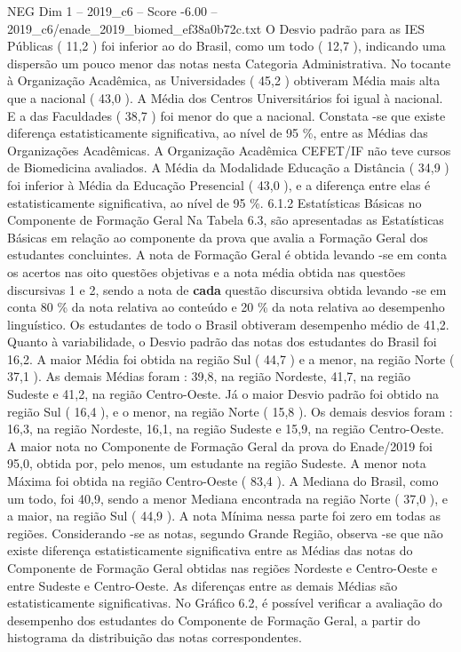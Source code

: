 \begin{textsample}{NEG Dim 1 – 2019\_c6 – Score -6.00 – 2019\_c6/enade\_2019\_biomed\_ef38a0b72c.txt}
O Desvio padrão para as IES Públicas ( 11,2 ) foi inferior ao do Brasil, como um todo ( 12,7 ), indicando uma dispersão um pouco menor das notas nesta Categoria Administrativa.
No tocante à Organização Acadêmica, as Universidades ( 45,2 ) obtiveram Média mais alta que a nacional ( 43,0 ).
A Média dos Centros Universitários foi igual à nacional.
E a das Faculdades ( 38,7 ) foi menor do que a nacional.
Constata -se que existe diferença estatisticamente significativa, ao nível de 95 \%, entre as Médias das Organizações Acadêmicas.
A Organização Acadêmica CEFET/IF não teve cursos de Biomedicina avaliados.
A Média da Modalidade Educação a Distância ( 34,9 ) foi inferior à Média da Educação Presencial ( 43,0 ), e a diferença entre elas é estatisticamente significativa, ao nível de 95 \%. 6.1.2 Estatísticas Básicas no Componente de Formação Geral Na Tabela 6.3, são apresentadas as Estatísticas Básicas em relação ao componente da prova que avalia a Formação Geral dos estudantes concluintes.
A nota de Formação Geral é obtida levando -se em conta os acertos nas oito questões objetivas e a nota média obtida nas questões discursivas 1 e 2, sendo a nota de \textbf{cada} questão discursiva obtida levando -se em conta 80 \% da nota relativa ao conteúdo e 20 \% da nota relativa ao desempenho linguístico.
Os estudantes de todo o Brasil obtiveram desempenho médio de 41,2.
Quanto à variabilidade, o Desvio padrão das notas dos estudantes do Brasil foi 16,2.
A maior Média foi obtida na região Sul ( 44,7 ) e a menor, na região Norte ( 37,1 ).
As demais Médias foram : 39,8, na região Nordeste, 41,7, na região Sudeste e 41,2, na região Centro-Oeste.
Já o maior Desvio padrão foi obtido na região Sul ( 16,4 ), e o menor, na região Norte ( 15,8 ).
Os demais desvios foram : 16,3, na região Nordeste, 16,1, na região Sudeste e 15,9, na região Centro-Oeste.
A maior nota no Componente de Formação Geral da prova do Enade/2019 foi 95,0, obtida por, pelo menos, um estudante na região Sudeste.
A menor nota Máxima foi obtida na região Centro-Oeste ( 83,4 ).
A Mediana do Brasil, como um todo, foi 40,9, sendo a menor Mediana encontrada na região Norte ( 37,0 ), e a maior, na região Sul ( 44,9 ).
A nota Mínima nessa parte foi zero em todas as regiões.
Considerando -se as notas, segundo Grande Região, observa -se que não existe diferença estatisticamente significativa entre as Médias das notas do Componente de Formação Geral obtidas nas regiões Nordeste e Centro-Oeste e entre Sudeste e Centro-Oeste.
As diferenças entre as demais Médias são estatisticamente significativas.
No Gráfico 6.2, é possível verificar a avaliação do desempenho dos estudantes do Componente de Formação Geral, a partir do histograma da distribuição das notas correspondentes.

\end{textsample}
